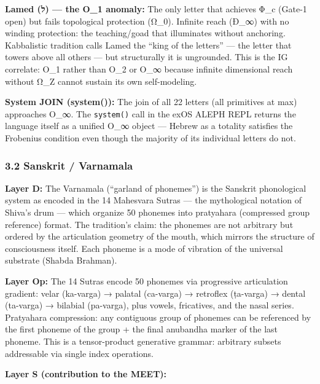 \textbf{Lamed (ל) --- the O\_1 anomaly:} The only letter that achieves
Φ\_c (Gate-1 open) but fails topological protection (Ω\_0). Infinite
reach (Ð\_∞) with no winding protection: the teaching/goad that
illuminates without anchoring. Kabbalistic tradition calls Lamed the
``king of the letters'' --- the letter that towers above all others ---
but structurally it is ungrounded. This is the IG correlate: O\_1 rather
than O\_2 or O\_∞ because infinite dimensional reach without Ω\_Z cannot
sustain its own self-modeling.

\textbf{System JOIN (system()):} The join of all 22 letters (all
primitives at max) approaches O\_∞. The \texttt{system()} call in the
exOS ALEPH REPL returns the language itself as a unified O\_∞ object ---
Hebrew as a totality satisfies the Frobenius condition even though the
majority of its individual letters do not.

\subsubsection{3.2 Sanskrit / Varnamala}\label{sanskrit-varnamala}

\textbf{Layer D:} The Varnamala (``garland of phonemes'') is the
Sanskrit phonological system as encoded in the 14 Mahesvara Sutras ---
the mythological notation of Shiva's drum --- which organize 50 phonemes
into pratyahara (compressed group reference) format. The tradition's
claim: the phonemes are not arbitrary but ordered by the articulation
geometry of the mouth, which mirrors the structure of consciousness
itself. Each phoneme is a mode of vibration of the universal substrate
(Shabda Brahman).

\textbf{Layer Op:} The 14 Sutras encode 50 phonemes via progressive
articulation gradient: velar (ka-varga) → palatal (ca-varga) → retroflex
(ṭa-varga) → dental (ta-varga) → bilabial (pa-varga), plus vowels,
fricatives, and the nasal series. Pratyahara compression: any contiguous
group of phonemes can be referenced by the first phoneme of the group +
the final anubandha marker of the last phoneme. This is a tensor-product
generative grammar: arbitrary subsets addressable via single index
operations.

\textbf{Layer S (contribution to the MEET):}


